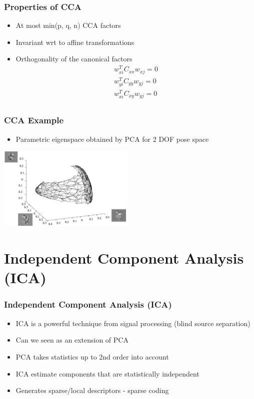 \documentclass[10pt]{beamer}
\begin{document}
\begin{frame}
  \frametitle{Properties of CCA}
  \begin{itemize}
  \item At most min(p, q, n) CCA factors
  \item Invariant wrt to affine transformations
  \item Orthogonality of the canonical factors
    \begin{eqnarray*}
      w_{xi}^T C_{xx} w_{xj} = 0 \\
      w_{yi}^T C_{yy} w_{yj} = 0 \\
      w_{xi}^T C_{xy} w_{yj} = 0 \\
    \end{eqnarray*}
  \end{itemize}
\end{frame}

\begin{frame}
  \frametitle{CCA Example}
  \begin{itemize}
  \item Parametric eigenspace obtained by PCA for 2 DOF pose space
  \end{itemize}
  \centerline{\includegraphics[height=4cm]{cca-manifold}}
\end{frame}

\section{Independent Component Analysis (ICA)}
\label{sec:ica}

\begin{frame}
  \frametitle{Independent Component Analysis (ICA)}
  \begin{itemize}
  \item ICA is a powerful technique from signal processing (blind source separation)
  \item Can we seen as an extension of PCA
  \item PCA takes statistics up to 2nd order into account
  \item ICA estimate components that are statistically independent
  \item Generates sparse/local descriptors - sparse coding
  \end{itemize}
\end{frame}
\end{document}
